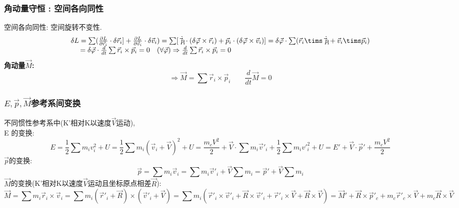 \documentclass{article}
\begin{document}
\subsubsection{角动量守恒 : 空间各向同性}
空间各向同性: 空间旋转不变性.
\begin{displaymath}
\begin{array}{ll}
\delta L = \sum (\frac{\partial L}{\partial \vec r_i} \cdot \delta \vec r_i] + \frac{\partial L}{\partial \vec v_i} \cdot \delta \vec v_i)
 = \sum [\dot{\vec p_i} \cdot (\delta \vec \varphi \times \vec r_i) + \vec p_i \cdot ( \delta \vec \varphi \times \vec v_i )]
 = \delta \vec \varphi \cdot \sum (\vec r_i \tims \dot{\vec p_i} + \vec v_i \tims \vec p_i) \\
 \quad\  = \delta \vec \varphi \cdot \frac{d}{dt} \sum \vec r_i \times \vec p_i
 = 0\quad(\forall \vec \varphi)
 \Rightarrow \frac{d}{dt}\sum \vec r_i \times \vec p_i = 0
\end{array}
\end{displaymath}
\textbf{角动量$\vec M$: }
\[\Rightarrow \vec M = \sum \vec r_i \times \vec p_i \qquad \frac{d}{dt}\vec M = 0\]


\subsubsection{$E,\vec p,\vec M$参考系间变换}
不同惯性参考系中(K'相对K以速度$\vec V$运动),\\
E 的变换:
\[E = \frac{1}{2} \sum m_iv_i^2 + U = \frac{1}{2} \sum m_i(\vec v_i + \vec V)^2 + U 
 = \frac{m_c V^2}{2} + \vec V \cdot \sum m_i \vec v'_i + \frac{1}{2} \sum m_i v'_i^2 + U
 = E' + \vec V \cdot \vec p' + \frac{m_c V^2}{2}\]
$\vec p$的变换:
\[\vec p = \sum m_i \vec v_i = \sum m_i \vec v'_i + \vec V \sum m_i = \vec p' + \vec V \sum m_i\]
$\vec M$的变换(K'相对K以速度$\vec V$运动且坐标原点相差$\vec R$):
\[\vec M = \sum m_i \vec r_i \times \vec v_i = \sum m_i (\vec r'_i + \vec R) \times (\vec v'_i + \vec V)
 = \sum m_i( \vec r'_i \times \vec v'_i +  \vec R \times \vec v'_i + \vec r'_i \times \vec V + \vec R \times \vec V)
 = \vec M' + \vec R \times \vec p'_c + m_c \vec r'_c \times \vec V + m_c \vec R \times \vec V\]
\end{document}
